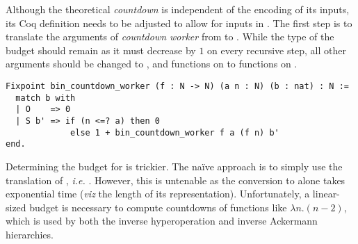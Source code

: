 Although the theoretical \emph{countdown} is independent of the encoding 
of its inputs, its Coq definition needs to be adjusted to allow for inputs 
in . The first step is to translate the arguments of 
\emph{countdown worker} from  to . While the type of 
the budget  should remain  as it must decrease by $1$ on 
every recursive step, all other  arguments should be changed 
to , and functions on  to functions on .
\begin{lstlisting}
Fixpoint bin_countdown_worker (f : N -> N) (a n : N) (b : nat) : N :=
  match b with
  | O    => 0
  | S b' => if (n <=? a) then 0
             else 1 + bin_countdown_worker f a (f n) b'
end.
\end{lstlisting}
Determining the budget for  is trickier. 
The naïve approach is to simply use the  translation of , 
\emph{i.e.} . However, this is untenable as the conversion 
to  alone takes exponential time 
(\emph{viz} the length of its representation).
Unfortunately, a linear-sized budget is necessary to compute countdowns 
of functions like $\lambda n.(n-2)$, which is used by both the inverse 
hyperoperation and inverse Ackermann hierarchies.


